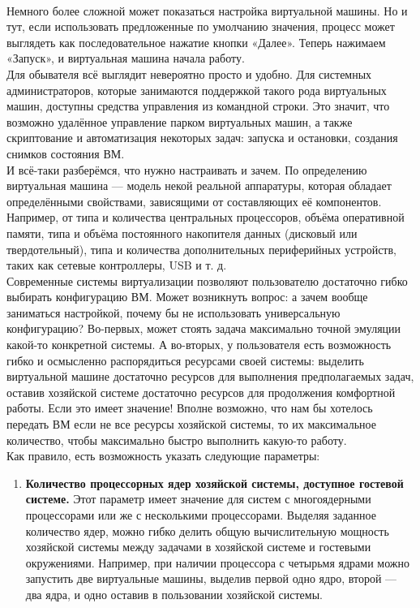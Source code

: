 \documentclass[14pt, a4paper]{article}
\begin{document}
\begin{figure}[h]
    \centering
    \\
    \label{framework} 
\end{figure}

Немного более сложной может показаться настройка виртуальной машины. Но и тут, если
использовать предложенные по умолчанию значения, процесс может выглядеть как последовательное
нажатие кнопки «Далее». Теперь нажимаем «Запуск», и виртуальная машина начала работу.\\

Для обывателя всё выглядит невероятно просто и удобно. Для системных администраторов, которые
занимаются поддержкой такого рода виртуальных машин, доступны средства управления из
командной строки. Это значит, что возможно удалённое управление парком виртуальных машин, а
также скриптование и автоматизация некоторых задач: запуска и остановки, создания снимков
состояния ВМ.\\

И всё-таки разберёмся, что нужно настраивать и зачем. По определению виртуальная машина —
модель некой реальной аппаратуры, которая обладает определёнными свойствами, зависящими от
составляющих её компонентов. Например, от типа и количества центральных процессоров, объёма
оперативной памяти, типа и объёма постоянного накопителя данных (дисковый или твердотельный),
типа и количества дополнительных периферийных устройств, таких как сетевые контроллеры, USB и
т. д.\\

Современные системы виртуализации позволяют пользователю достаточно гибко выбирать
конфигурацию ВМ. Может возникнуть вопрос: а зачем вообще заниматься настройкой, почему бы не
использовать универсальную конфигурацию? Во-первых, может стоять задача максимально точной
эмуляции какой-то конкретной системы. А во-вторых, у пользователя есть возможность гибко и
осмысленно распорядиться ресурсами своей системы: выделить виртуальной машине достаточно ресурсов для выполнения предполагаемых задач, оставив хозяйской системе достаточно ресурсов
для продолжения комфортной работы. Если это имеет значение! Вполне возможно, что нам бы
хотелось передать ВМ если не все ресурсы хозяйской системы, то их максимальное количество,
чтобы максимально быстро выполнить какую-то работу.\\

Как правило, есть возможность указать следующие параметры:
\begin{enumerate}
    \item \textbf{Количество процессорных ядер хозяйской системы, доступное гостевой системе.} Этот
    параметр имеет значение для систем с многоядерными процессорами или же с несколькими
    процессорами. Выделяя заданное количество ядер, можно гибко делить общую
    вычислительную мощность хозяйской системы между задачами в хозяйской системе и
    гостевыми окружениями. Например, при наличии процессора с четырьмя ядрами можно
    запустить две виртуальные машины, выделив первой одно ядро, второй — два ядра, и одно
    оставив в пользовании хозяйской системы.
\end{enumerate}
\end{document}
